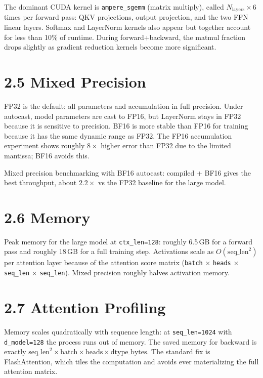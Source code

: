 \documentclass[11pt]{article}
\begin{document}
The dominant CUDA kernel is \texttt{ampere\_sgemm} (matrix multiply), called
$N_\text{layers} \times 6$ times per forward pass: QKV projections, output
projection, and the two FFN linear layers.
Softmax and LayerNorm kernels also appear but together account for less than
10\% of runtime.
During forward+backward, the matmul fraction drops slightly as gradient
reduction kernels become more significant.

\section*{2.5 Mixed Precision}

FP32 is the default: all parameters and accumulation in full precision.
Under autocast, model parameters are cast to FP16, but LayerNorm stays in FP32
because it is sensitive to precision.
BF16 is more stable than FP16 for training because it has the same dynamic
range as FP32.
The FP16 accumulation experiment shows roughly $8\times$ higher error than
FP32 due to the limited mantissa; BF16 avoids this.

Mixed precision benchmarking with BF16 autocast: compiled + BF16 gives the
best throughput, about $2.2\times$ vs the FP32 baseline for the large model.

\section*{2.6 Memory}

Peak memory for the large model at \texttt{ctx\_len=128}: roughly 6.5\,GB for
a forward pass and roughly 18\,GB for a full training step.
Activations scale as $O(\text{seq\_len}^2)$ per attention layer because of the
attention score matrix (\texttt{batch} $\times$ \texttt{heads} $\times$
\texttt{seq\_len} $\times$ \texttt{seq\_len}).
Mixed precision roughly halves activation memory.

\section*{2.7 Attention Profiling}

Memory scales quadratically with sequence length: at \texttt{seq\_len=1024}
with \texttt{d\_model=128} the process runs out of memory.
The saved memory for backward is exactly
$\text{seq\_len}^2 \times \text{batch} \times \text{heads} \times
\text{dtype\_bytes}$.
The standard fix is FlashAttention, which tiles the computation and avoids
ever materializing the full attention matrix.
\end{document}
